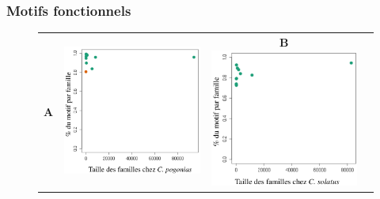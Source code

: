 \documentclass[12pt,a4paper]{article}
\begin{document}
			\subsubsection{Motifs fonctionnels}
\begin{figure}	
	\begin{tabular}{cccc} 
		\textbf{A} & \includegraphics[scale=0.3]{img/motif_pogonias.png} & \textbf{B} \includegraphics[scale=0.3]{img/motif_solatus.png} \\

\end{tabular}
\end{figure}
\end{document}
